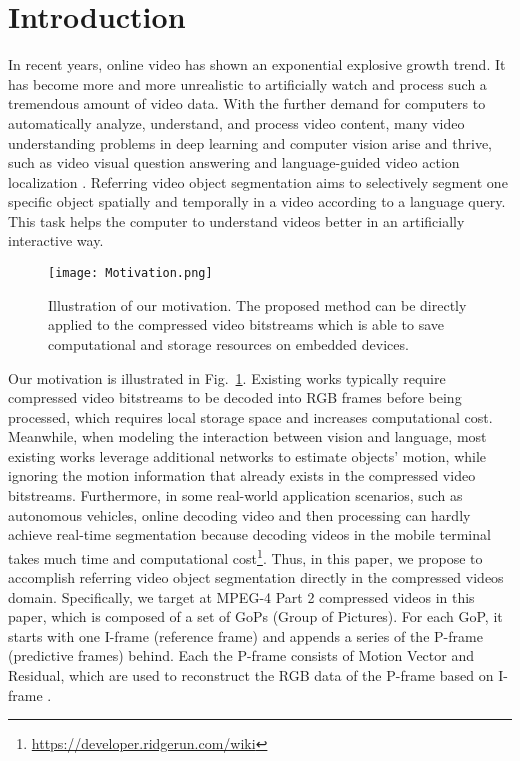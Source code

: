 \documentclass[sigconf]{acmart}
\begin{document}
\section{Introduction}


In recent years, online video has shown an exponential explosive growth trend. It has become more and more unrealistic to artificially watch and process such a tremendous amount of video data. 
With the further demand for computers to automatically analyze, understand, and process video content, many video understanding problems \cite{qzhb2020ckmn, srl, qzhb2020tdc} in deep learning and computer vision arise and thrive, such as video visual question answering \cite{li2020boosting, liu2020cascade, cui2021rosita, han2021greedy, han2020interpretable} and language-guided video action localization \cite{qu2020fine, cao2020strong}. Referring video object segmentation aims to selectively segment one specific object spatially and temporally in a video 
according to a language query. This task helps the computer to understand videos better in an artificially interactive way.



\begin{figure}[t]
\centering
\texttt{[image: Motivation.png]}
\caption{Illustration of our motivation. The proposed method can be directly applied to the compressed video bitstreams which is able to save computational and storage resources on embedded devices.}
\vspace{-12pt}
\label{Motivation}
\end{figure}

Our motivation is illustrated in Fig.~\ref{Motivation}. Existing works typically require compressed video bitstreams to be decoded into RGB frames before being processed, which requires local storage space and increases computational cost. Meanwhile, when modeling the interaction between vision and language, most existing works \cite{gavrilyuk2018actor, chen2021cascade, wang2020context, yang2021hierarchical} leverage additional networks to estimate objects' motion, while ignoring the motion information that already exists in the compressed video bitstreams. 
Furthermore, in some real-world application scenarios, such as autonomous vehicles, online decoding video and then processing can hardly achieve real-time segmentation because decoding videos in the mobile terminal takes much time and computational cost\footnote{\url{https://developer.ridgerun.com/wiki}}. 
Thus, in this paper, we propose to accomplish referring video object segmentation directly in the compressed videos domain. Specifically, we target at MPEG-4\cite{mpeg} Part 2 compressed videos in this paper, which is composed of a set of GoPs (Group of Pictures). For each GoP, it starts with one I-frame (reference frame) and appends a series of the P-frame (predictive frames) behind. Each the P-frame consists of Motion Vector and Residual, which are used to reconstruct the RGB data of the P-frame based on I-frame \cite{li2020slow}.
\end{document}

